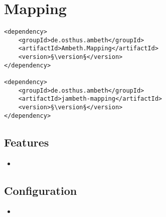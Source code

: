 \section{Mapping}
\label{module:Mapping}
\ClearAPI
\TODO
\begin{lstlisting}[style=POM,caption={Maven modules to use \emph{Ambeth Mapping}}]
<dependency>
	<groupId>de.osthus.ambeth</groupId>
	<artifactId>Ambeth.Mapping</artifactId>
	<version>§\version§</version>
</dependency>

<dependency>
	<groupId>de.osthus.ambeth</groupId>
	<artifactId>jambeth-mapping</artifactId>
	<version>§\version§</version>
</dependency>
\end{lstlisting}
\subsection{Features}
\begin{itemize}
	\item \TODO
\end{itemize}

\subsection{Configuration}
\begin{itemize}
	\item {}
\end{itemize}
